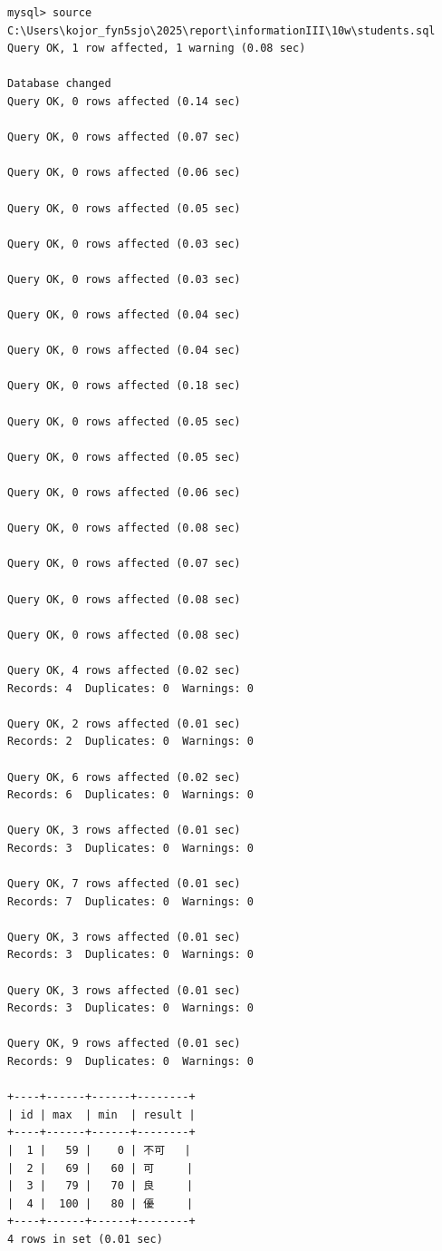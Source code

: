 \documentclass[a4paper,11pt]{ltjsarticle}
\begin{document}
\begin{lstlisting}[caption={SQL実行結果}, label={lst:sql_result}]
  mysql> source C:\Users\kojor_fyn5sjo\2025\report\informationIII\10w\students.sql
Query OK, 1 row affected, 1 warning (0.08 sec)

Database changed
Query OK, 0 rows affected (0.14 sec)

Query OK, 0 rows affected (0.07 sec)

Query OK, 0 rows affected (0.06 sec)

Query OK, 0 rows affected (0.05 sec)

Query OK, 0 rows affected (0.03 sec)

Query OK, 0 rows affected (0.03 sec)

Query OK, 0 rows affected (0.04 sec)

Query OK, 0 rows affected (0.04 sec)

Query OK, 0 rows affected (0.18 sec)

Query OK, 0 rows affected (0.05 sec)

Query OK, 0 rows affected (0.05 sec)

Query OK, 0 rows affected (0.06 sec)

Query OK, 0 rows affected (0.08 sec)

Query OK, 0 rows affected (0.07 sec)

Query OK, 0 rows affected (0.08 sec)

Query OK, 0 rows affected (0.08 sec)

Query OK, 4 rows affected (0.02 sec)
Records: 4  Duplicates: 0  Warnings: 0

Query OK, 2 rows affected (0.01 sec)
Records: 2  Duplicates: 0  Warnings: 0

Query OK, 6 rows affected (0.02 sec)
Records: 6  Duplicates: 0  Warnings: 0

Query OK, 3 rows affected (0.01 sec)
Records: 3  Duplicates: 0  Warnings: 0

Query OK, 7 rows affected (0.01 sec)
Records: 7  Duplicates: 0  Warnings: 0

Query OK, 3 rows affected (0.01 sec)
Records: 3  Duplicates: 0  Warnings: 0

Query OK, 3 rows affected (0.01 sec)
Records: 3  Duplicates: 0  Warnings: 0

Query OK, 9 rows affected (0.01 sec)
Records: 9  Duplicates: 0  Warnings: 0

+----+------+------+--------+
| id | max  | min  | result |
+----+------+------+--------+
|  1 |   59 |    0 | 不可   |
|  2 |   69 |   60 | 可     |
|  3 |   79 |   70 | 良     |
|  4 |  100 |   80 | 優     |
+----+------+------+--------+
4 rows in set (0.01 sec)


\end{lstlisting}
\end{document}

